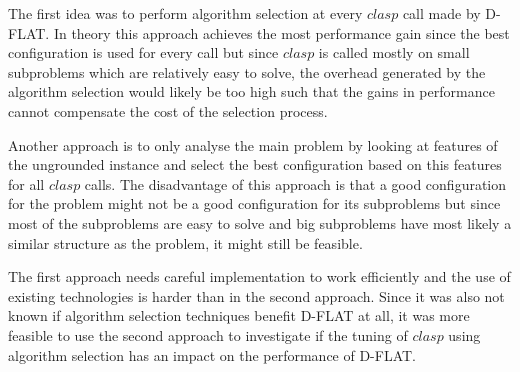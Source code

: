 The first idea was to perform algorithm selection at every \inline$clasp$ call made by \mbox{D-FLAT}. In theory this approach achieves the most performance gain since the best configuration is used for every call but since \inline$clasp$ is called mostly on small subproblems which are relatively easy to solve, the overhead generated by the algorithm selection would likely be too high such that the gains in performance cannot compensate the cost of the selection process.

Another approach is to only analyse the main problem by looking at features of the ungrounded instance and select the best configuration based on this features for all \inline$clasp$ calls. The disadvantage of this approach is that a good configuration for the problem might not be a good configuration for its subproblems but since most of the subproblems are easy to solve and big subproblems have most likely a similar structure as the problem, it might still be feasible.

The first approach needs careful implementation to work efficiently and the use of existing technologies is harder than in the second approach. Since it was also not known if algorithm selection techniques benefit \mbox{D-FLAT} at all, it was more feasible to use the second approach to investigate if the tuning of \inline$clasp$ using algorithm selection has an impact on the performance of \mbox{D-FLAT}.

